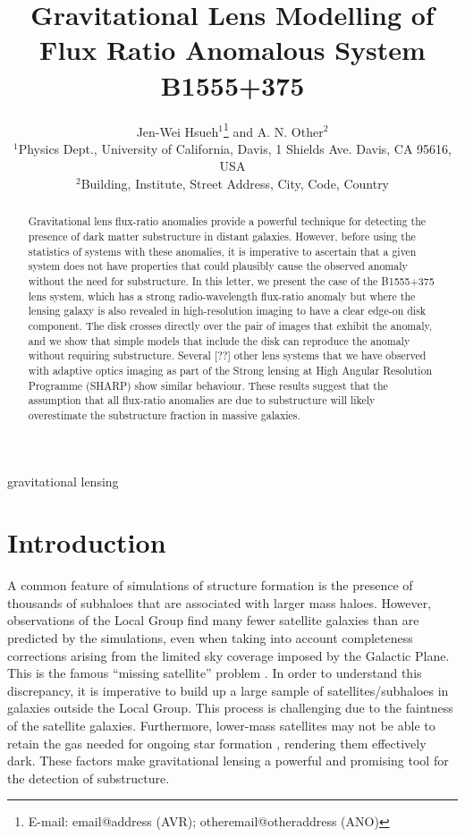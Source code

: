 \documentclass[useAMS,usenatbib]{mn2e}
\title[Beware the Effect of Edge-on Disks]{Gravitational Lens Modelling of Flux Ratio Anomalous System B1555+375}
\author[Hsueh et al.]{Jen-Wei Hsueh$^{1}$\thanks{E-mail:
email@address (AVR); otheremail@otheraddress (ANO)} and A. N.
Other$^{2}$\\
$^{1}$Physics Dept., University of California, Davis, 1 Shields Ave.
Davis, CA 95616, USA\\
$^{2}$Building, Institute, Street Address, City, Code, Country}
\begin{document}

\pagerange{\pageref{firstpage}--\pageref{lastpage}} 

\maketitle

\label{firstpage}

\begin{abstract}

Gravitational lens flux-ratio anomalies provide a powerful technique
for detecting the presence of dark matter substructure in distant
galaxies.  However, before using the statistics of systems with these
anomalies, it is imperative to ascertain that a given system does not
have properties that could plausibly cause the observed anomaly
without the need for substructure.  In this letter, we present the
case of the B1555+375 lens system, which has a strong radio-wavelength
flux-ratio anomaly but where the lensing galaxy is also revealed in
high-resolution imaging to have a clear edge-on disk component.  The
disk crosses directly over the pair of images that exhibit the
anomaly, and we show that simple models that include the disk can
reproduce the anomaly without requiring substructure.  Several [??]
other lens systems that we have observed with adaptive optics imaging
as part of the Strong lensing at High Angular Resolution Programme (SHARP)
show similar behaviour.  These results suggest that the assumption that
all flux-ratio anomalies are due to substructure will likely overestimate
the substructure fraction in massive galaxies.

\end{abstract}

\begin{keywords}
gravitational lensing
\end{keywords}

\section{Introduction}

A common feature of simulations of structure formation is the presence
of thousands of subhaloes that are associated with larger mass haloes.
However, observations of the Local Group find many fewer satellite
galaxies than are predicted by the simulations, even when taking into
account completeness corrections arising from the limited sky coverage
imposed by the Galactic Plane.  This is the famous ``missing
satellite'' problem \citep{Klypin1999, Moore1999, S07}. In order to
understand this discrepancy, it is imperative to build up a large
sample of satellites/subhaloes in galaxies outside the Local Group.
This process is challenging due to the faintness of the satellite
galaxies.  Furthermore, lower-mass satellites may not be able to
retain the gas needed for ongoing star formation \citep[e.g.,][]{P11},
rendering them effectively dark.  These factors make gravitational
lensing a powerful and promising tool for the detection of
substructure.
\end{document}
